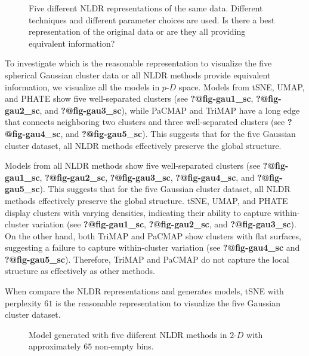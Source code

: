 \documentclass[
  12pt]{article}
\newcommand\pD{$p\text{-}D$}
\begin{document}
\begin{figure}[H]


\caption{\label{fig-NLDR-variety-gau}Five different NLDR representations
of the same data. Different techniques and different parameter choices
are used. Is there a best representation of the original data or are
they all providing equivalent information?}

\end{figure}%

To investigate which is the reasonable representation to visualize the
five spherical Gaussian cluster data or all NLDR methods provide
equivalent information, we visualize all the models in \pD{} space.
Models from tSNE, UMAP, and PHATE show five well-separated clusters (see
\textbf{?@fig-gau1\_sc}, \textbf{?@fig-gau2\_sc}, and
\textbf{?@fig-gau3\_sc}), while PaCMAP and TriMAP have a long edge that
connects neighboring two clusters and three well-separated clusters (see
\textbf{?@fig-gau4\_sc}, and \textbf{?@fig-gau5\_sc}). This suggests
that for the five Gaussian cluster dataset, all NLDR methods effectively
preserve the global structure.

Models from all NLDR methods show five well-separated clusters (see
\textbf{?@fig-gau1\_sc}, \textbf{?@fig-gau2\_sc},
\textbf{?@fig-gau3\_sc}, \textbf{?@fig-gau4\_sc}, and
\textbf{?@fig-gau5\_sc}). This suggests that for the five Gaussian
cluster dataset, all NLDR methods effectively preserve the global
structure. tSNE, UMAP, and PHATE display clusters with varying
densities, indicating their ability to capture within-cluster variation
(see \textbf{?@fig-gau1\_sc}, \textbf{?@fig-gau2\_sc}, and
\textbf{?@fig-gau3\_sc}). On the other hand, both TriMAP and PaCMAP show
clusters with flat surfaces, suggesting a failure to capture
within-cluster variation (see \textbf{?@fig-gau4\_sc} and
\textbf{?@fig-gau5\_sc}). Therefore, TriMAP and PaCMAP do not capture
the local structure as effectively as other methods.

When compare the NLDR representations and generates models, tSNE with
perplexity \(61\) is the reasonable representation to visualize the five
Gaussian cluster dataset.

\begin{figure}[H]


\caption{\label{fig-trimesh-gau}Model generated with five diiferent NLDR
methods in \(2\text{-}D\) with approximately \(65\) non-empty bins.}

\end{figure}%
\end{document}
